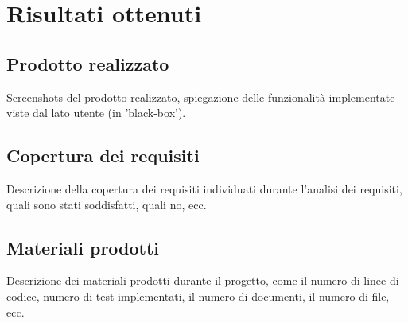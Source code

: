 \section{Risultati ottenuti}
\label{sez:risultati-ottenuti}


\subsection{Prodotto realizzato}
\label{subsec:prodotto-realizzato}

Screenshots del prodotto realizzato, spiegazione delle funzionalità implementate viste dal lato utente (in 'black-box').

\subsection{Copertura dei requisiti}
\label{subsec:copertura-requisiti}

Descrizione della copertura dei requisiti individuati durante l'analisi dei requisiti, quali sono stati soddisfatti, quali no, ecc.

\subsection{Materiali prodotti}
\label{subsec:materiali-prodotti}

Descrizione dei materiali prodotti durante il progetto, come il numero di linee di codice, numero di test implementati, il numero di documenti, il numero di file, ecc.\\